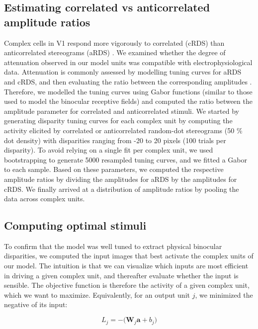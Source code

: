 \subsection{Estimating correlated vs anticorrelated amplitude ratios}

Complex cells in V1 respond more vigorously to correlated (cRDS) than anticorrelated stereograms (aRDS) \cite{Cumming:1997ve}. We examined whether the degree of attenuation observed in our model units was compatible with electrophysiological data. Attenuation is commonly assessed by modelling tuning curves for aRDS and cRDS, and then evaluating the ratio between the corresponding amplitudes \cite{Cumming:1997ve,Samonds:2013cs}. Therefore, we modelled the tuning curves using Gabor functions (similar to those used to model the binocular receptive fields) and computed the ratio between the amplitude parameter for correlated and anticorrelated stimuli. We started by generating disparity tuning curves for each complex unit by computing the activity elicited by correlated or anticorrelated random-dot stereograms (50 \% dot density) with disparities ranging from -20 to 20 pixels (100 trials per disparity). To avoid relying on a single fit per complex unit, we used bootstrapping to generate 5000 resampled tuning curves, and we fitted a Gabor to each sample. Based on these parameters, we computed the respective amplitude ratios by dividing the amplitudes for aRDS by the amplitudes for cRDS. We finally arrived at a distribution of amplitude ratios by pooling the data across complex units.

\subsection{Computing optimal stimuli}\label{ssec:OptStim}

To confirm that the model was well tuned to extract physical binocular disparities, we computed the input images that best activate the complex units of our model. The intuition is that we can visualize which inputs are most efficient in driving a given complex unit, and thereafter evaluate whether the input is sensible. The objective function is therefore the activity of a given complex unit, which we want to maximize. Equivalently, for an output unit $j$, we minimized the negative of its input:

\begin{equation}
  L_j = - \big( \mathbf{W}_j \mathbf{a} + b_j \big) 
  \label{eq:OptLoss}
\end{equation}

